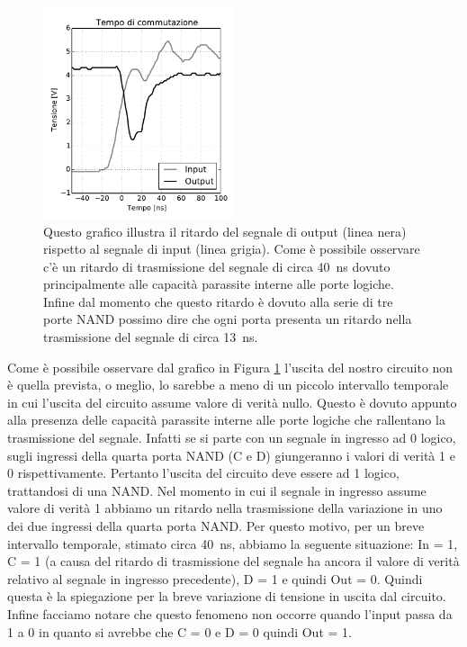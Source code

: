 \begin{figure}[h]
    \centering
    \includegraphics[width=0.5\textwidth]{figure/comm_time.pdf}
    \caption{Questo grafico illustra il ritardo del segnale di output (linea nera) rispetto al segnale di input (linea grigia). Come è possibile osservare c'è un ritardo di trasmissione del segnale di circa \SI{40}{\nano\second} dovuto principalmente alle capacità parassite interne alle porte logiche. Infine dal momento che questo ritardo è dovuto alla serie di tre porte NAND possimo dire che ogni porta presenta un ritardo nella trasmissione del segnale di circa \SI{13}{\nano\second}.}
    \label{fig:ritardo1}
\end{figure}

Come è possibile osservare dal grafico in Figura \ref{fig:ritardo1} l'uscita del nostro circuito non è quella prevista, o meglio, lo sarebbe a meno di un piccolo intervallo temporale in cui l'uscita del circuito assume valore di verità nullo. Questo è dovuto appunto alla presenza delle capacità parassite interne alle porte logiche che rallentano la trasmissione del segnale. Infatti se si parte con un segnale in ingresso ad 0 logico, sugli ingressi della quarta porta NAND (C e D) giungeranno i valori di verità 1 e 0 rispettivamente. Pertanto l'uscita del circuito deve essere ad 1 logico, trattandosi di una NAND. Nel momento in cui il segnale in ingresso assume valore di verità 1 abbiamo un ritardo nella trasmissione della variazione in uno dei due ingressi della quarta porta NAND. Per questo motivo, per un breve intervallo temporale, stimato circa \SI{40}{\nano\second}, abbiamo la seguente situazione: In = 1, C = 1 (a causa del ritardo di trasmissione del segnale ha ancora il valore di verità relativo al segnale in ingresso precedente), D = 1 e quindi Out = 0. Quindi questa è la spiegazione per la breve variazione di tensione in uscita dal circuito. Infine facciamo notare che questo fenomeno non occorre quando l'input passa da 1 a 0 in quanto si avrebbe che C = 0 e D = 0 quindi Out = 1.

